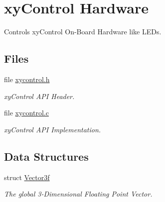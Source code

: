 \hypertarget{group__xycontrol}{\section{xy\-Control Hardware}
\label{group__xycontrol}
}


Controls xy\-Control On-\/\-Board Hardware like L\-E\-Ds.  


\subsection*{Files}
\begin{DoxyCompactItemize}
\item 
file \hyperlink{xycontrol_8h}{xycontrol.\-h}
\begin{DoxyCompactList}\small\item\em xy\-Control A\-P\-I Header. \end{DoxyCompactList}\item 
file \hyperlink{xycontrol_8c}{xycontrol.\-c}
\begin{DoxyCompactList}\small\item\em xy\-Control A\-P\-I Implementation. \end{DoxyCompactList}\end{DoxyCompactItemize}
\subsection*{Data Structures}
\begin{DoxyCompactItemize}
\item 
struct \hyperlink{struct_vector3f}{Vector3f}
\begin{DoxyCompactList}\small\item\em The global 3-\/\-Dimensional Floating Point Vector. \end{DoxyCompactList}\end{DoxyCompactItemize}
